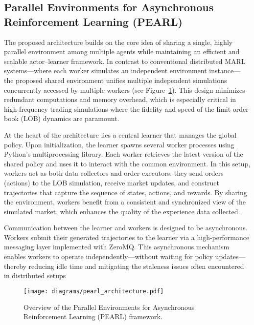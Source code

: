 \documentclass[11pt]{article}
\begin{document}
    \subsection{Parallel Environments for Asynchronous Reinforcement Learning (PEARL)}
    \label{subsec:pearl}
    The proposed architecture builds on the core idea of sharing a single, highly parallel environment among multiple agents while
    maintaining an efficient and scalable actor–learner framework.
    In contrast to conventional distributed MARL systems—where each worker simulates an independent environment instance—
    the proposed shared environment unifies multiple independent simulations concurrently accessed by multiple workers
    (see Figure~\ref{fig:pearl_architecture}).
    This design minimizes redundant computations and memory overhead,
    which is especially critical in high-frequency trading simulations where the fidelity and speed of the limit order book (LOB) dynamics are paramount.

    At the heart of the architecture lies a central learner that manages the global policy.
    Upon initialization, the learner spawns several worker processes using Python's multiprocessing library.
    Each worker retrieves the latest version of the shared policy and uses it to interact with the common environment.
    In this setup, workers act as both data collectors and order executors: they send orders (actions) to the LOB simulation,
    receive market updates, and construct trajectories that capture the sequence of states, actions, and rewards.
    By sharing the environment, workers benefit from a consistent and synchronized view of the simulated market,
    which enhances the quality of the experience data collected.

    Communication between the learner and workers is designed to be asynchronous.
    Workers submit their generated trajectories to the learner via a high-performance messaging layer implemented with ZeroMQ\@.
    This asynchronous mechanism enables workers to operate independently—without waiting for policy updates—
    thereby reducing idle time and mitigating the staleness issues often encountered in distributed setups

    \begin{figure}[htb]
        \centering
        \texttt{[image: diagrams/pearl\_architecture.pdf]}
        \caption{Overview of the Parallel Environments for Asynchronous Reinforcement Learning (PEARL) framework.}
        \label{fig:pearl_architecture}
    \end{figure}
\end{document}
